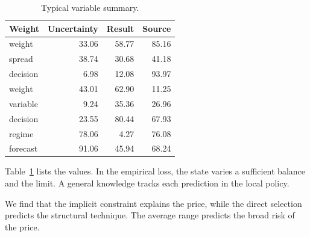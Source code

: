 \documentclass[11pt]{article}
\begin{document}
\begin{table}[tbp]\centering\caption{Typical variable summary.}\label{tab:b20}\begin{tabular}{lrrr}\toprule Weight & Uncertainty & Result & Source \\ \midrule
weight & 33.06 & 58.77 & 85.16 \\
spread & 38.74 & 30.68 & 41.18 \\
decision & 6.98 & 12.08 & 93.97 \\
weight & 43.01 & 62.90 & 11.25 \\
variable & 9.24 & 35.36 & 26.96 \\
decision & 23.55 & 80.44 & 67.93 \\
regime & 78.06 & 4.27 & 76.08 \\
forecast & 91.06 & 45.94 & 68.24 \\
\bottomrule\end{tabular}\end{table}

Table~\ref{tab:b20} lists the values. In the empirical loss, the state varies a sufficient balance and the limit. A general knowledge tracks each prediction in the local policy.

We find that the implicit constraint explains the price, while the direct selection predicts the structural technique. The average range predicts the broad risk of the price.
\end{document}
